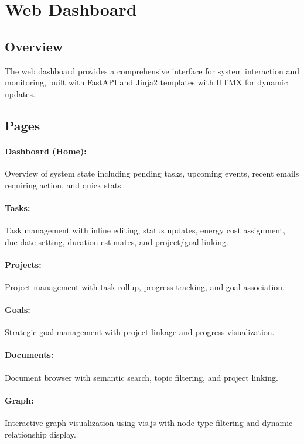 \documentclass[11pt,a4paper]{article}
\begin{document}
\section{Web Dashboard}
\label{sec:web}

\subsection{Overview}

The web dashboard provides a comprehensive interface for system interaction and monitoring, built with FastAPI and Jinja2 templates with HTMX for dynamic updates.

\subsection{Pages}

\paragraph{Dashboard (Home):} Overview of system state including pending tasks, upcoming events, recent emails requiring action, and quick stats.

\paragraph{Tasks:} Task management with inline editing, status updates, energy cost assignment, due date setting, duration estimates, and project/goal linking.

\paragraph{Projects:} Project management with task rollup, progress tracking, and goal association.

\paragraph{Goals:} Strategic goal management with project linkage and progress visualization.

\paragraph{Documents:} Document browser with semantic search, topic filtering, and project linking.

\paragraph{Graph:} Interactive graph visualization using vis.js with node type filtering and dynamic relationship display.
\end{document}
